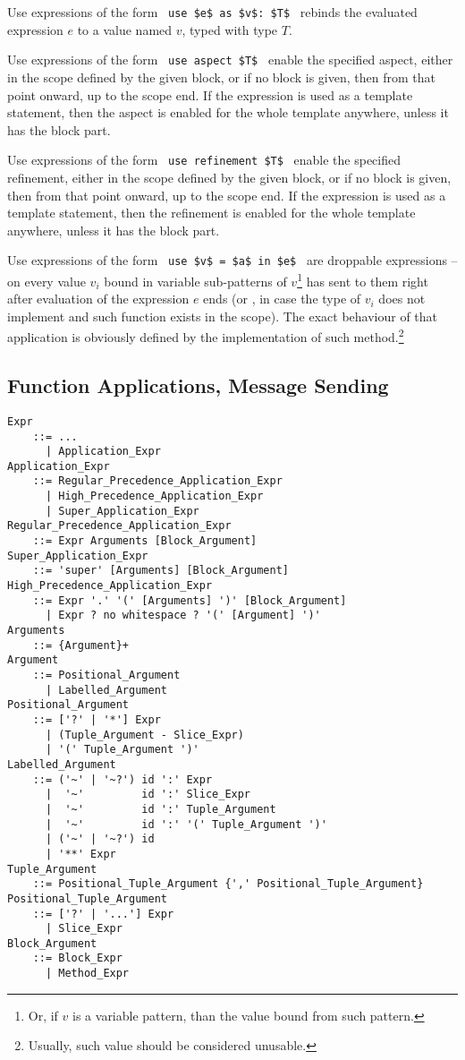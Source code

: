 Use expressions of the form ~\lstinline!use $e$ as $v$: $T$!~ rebinds the evaluated expression $e$ to a value named $v$, typed with type $T$.

Use expressions of the form ~\lstinline!use aspect $T$!~ enable the specified aspect, either in the scope defined by the given block, or if no block is given, then from that point onward, up to the scope end. If the expression is used as a template statement, then the aspect is enabled for the whole template anywhere, unless it has the block part. 

Use expressions of the form ~\lstinline!use refinement $T$!~ enable the specified refinement, either in the scope defined by the given block, or if no block is given, then from that point onward, up to the scope end. If the expression is used as a template statement, then the refinement is enabled for the whole template anywhere, unless it has the block part.

Use expressions of the form ~\lstinline!use $v$ = $a$ in $e$!~ are droppable expressions -- on every value $v_i$ bound in variable sub-patterns of $v$\footnote{Or, if $v$ is a variable pattern, than the value bound from such pattern.} has  sent to them right after evaluation of the expression $e$ ends (or , in case the type of $v_i$ does not implement  and such function exists in the scope). The exact behaviour of that application is obviously defined by the implementation of such method.\footnote{Usually, such value should be considered unusable.}







\subsection{Function Applications, Message Sending}
\label{sec:function-applications}

\grammar\begin{lstlisting}[deletekeywords={no}]
Expr
    ::= ...
      | Application_Expr
Application_Expr 
    ::= Regular_Precedence_Application_Expr 
      | High_Precedence_Application_Expr
      | Super_Application_Expr
Regular_Precedence_Application_Expr
    ::= Expr Arguments [Block_Argument]
Super_Application_Expr
    ::= 'super' [Arguments] [Block_Argument]
High_Precedence_Application_Expr
    ::= Expr '.' '(' [Arguments] ')' [Block_Argument]
      | Expr ? no whitespace ? '(' [Argument] ')'
Arguments
    ::= {Argument}+
Argument
    ::= Positional_Argument
      | Labelled_Argument
Positional_Argument 
    ::= ['?' | '*'] Expr
      | (Tuple_Argument - Slice_Expr)
      | '(' Tuple_Argument ')'
Labelled_Argument
    ::= ('~' | '~?') id ':' Expr
      |  '~'         id ':' Slice_Expr
      |  '~'         id ':' Tuple_Argument
      |  '~'         id ':' '(' Tuple_Argument ')'
      | ('~' | '~?') id
      | '**' Expr
Tuple_Argument 
    ::= Positional_Tuple_Argument {',' Positional_Tuple_Argument}
Positional_Tuple_Argument 
    ::= ['?' | '...'] Expr
      | Slice_Expr
Block_Argument
    ::= Block_Expr
      | Method_Expr
\end{lstlisting}

